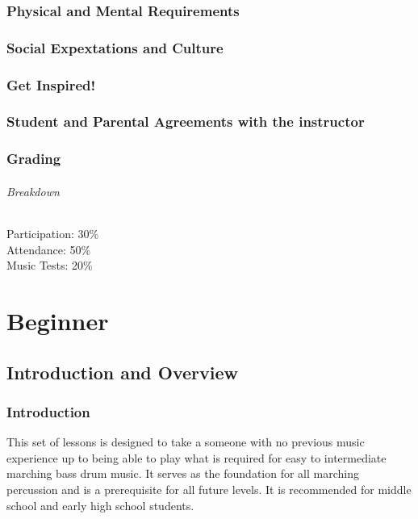 \documentclass[12pt,letterpaper]{book}
\begin{document}
\section{Physical and Mental Requirements}

\section{Social Expextations and Culture}

\section{Get Inspired!}

\section{Student and Parental Agreements with the instructor}

\section{Grading}

\paragraph{Breakdown}
Participation: 30\%\\
Attendance: 50\%\\
Music Tests: 20\%\\





\part{Beginner}
\chapter{Introduction and Overview}
\section{Introduction}

This set of lessons is designed to take a someone with no previous music experience up to being able to play what is required for easy to intermediate marching bass drum music.  It serves as the foundation for all marching percussion and is a prerequisite for all future levels.  It is recommended for middle school and early high school students.
\end{document}
